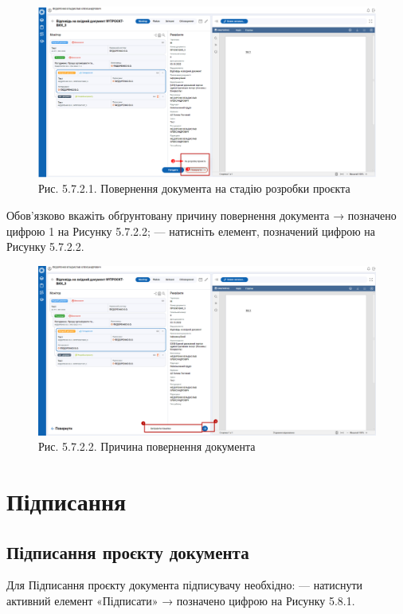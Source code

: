 \begin{figure}[!htbp]
\centerline{\includegraphics[width=\textwidth]{img/5.7.2.1.png}}
\caption{Рис. 5.7.2.1. Повернення документа на стадію розробки проєкта}
\end{figure}

Обов’язково вкажіть обґрунтовану причину повернення документа →
позначено цифрою 1 на Рисунку 5.7.2.2;
--- натисніть елемент, позначений цифрою  на Рисунку 5.7.2.2.

\begin{figure}[!htbp]
\centerline{\includegraphics[width=\textwidth]{img/5.7.2.2.png}}
\caption{Рис. 5.7.2.2. Причина повернення документа}
\end{figure}

\section{Підписання}

\subsection{Підписання проєкту документа}

Для Підписання проєкту документа підписувачу необхідно:
--- натиснути активний елемент «Підписати» → позначено цифрою  на
Рисунку 5.8.1.

